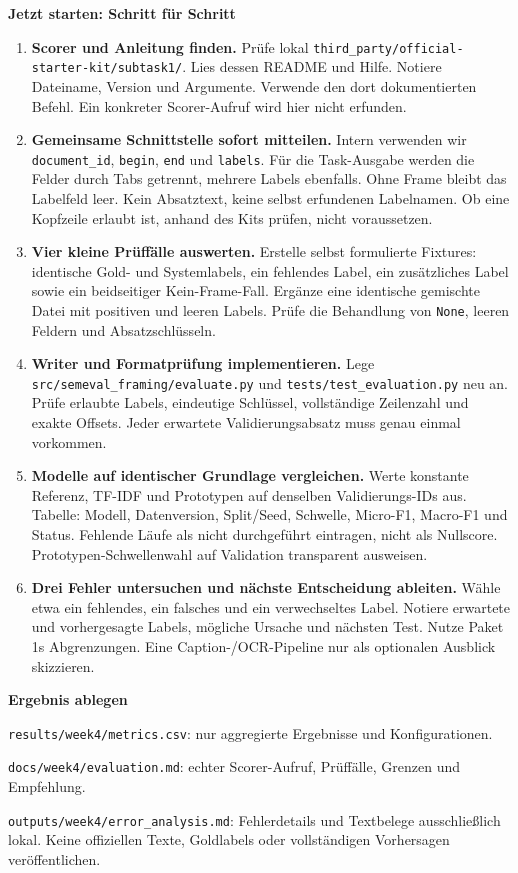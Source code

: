 \documentclass[10pt,a4paper]{article}
\newcommand{\checkbox}{\fbox{\rule{0pt}{2.4mm}\hspace{2.4mm}}}
\newcommand{\planheading}[1]{\par\vspace{9pt}\textbf{#1}\par\vspace{3pt}}
\newenvironment{startsteps}{\begin{enumerate}[leftmargin=12mm,label=\checkbox\hspace{2mm}\textbf{\arabic*.},labelsep=2mm,itemsep=7pt,parsep=2pt,topsep=4pt]}{\end{enumerate}}
\begin{document}
\planheading{Jetzt starten: Schritt für Schritt}
\begin{startsteps}
  \item \textbf{Scorer und Anleitung finden.}
    Prüfe lokal \texttt{third\_party/official-starter-kit/subtask1/}.
    Lies dessen README und Hilfe. Notiere Dateiname, Version und Argumente.
    Verwende den dort dokumentierten Befehl. Ein konkreter Scorer-Aufruf wird hier nicht erfunden.
  \item \textbf{Gemeinsame Schnittstelle sofort mitteilen.}
    Intern verwenden wir \texttt{document\_id}, \texttt{begin}, \texttt{end} und \texttt{labels}.
    Für die Task-Ausgabe werden die Felder durch Tabs getrennt, mehrere Labels ebenfalls.
    Ohne Frame bleibt das Labelfeld leer. Kein Absatztext, keine selbst erfundenen Labelnamen.
    Ob eine Kopfzeile erlaubt ist, anhand des Kits prüfen, nicht voraussetzen.
  \item \textbf{Vier kleine Prüffälle auswerten.}
    Erstelle selbst formulierte Fixtures: identische Gold- und Systemlabels,
    ein fehlendes Label, ein zusätzliches Label sowie ein beidseitiger Kein-Frame-Fall.
    Ergänze eine identische gemischte Datei mit positiven und leeren Labels.
    Prüfe die Behandlung von \texttt{None}, leeren Feldern und Absatzschlüsseln.
  \item \textbf{Writer und Formatprüfung implementieren.}
    Lege \texttt{src/semeval\_framing/evaluate.py} und
    \texttt{tests/test\_evaluation.py} neu an.
    Prüfe erlaubte Labels, eindeutige Schlüssel, vollständige Zeilenzahl und exakte Offsets.
    Jeder erwartete Validierungsabsatz muss genau einmal vorkommen.
  \item \textbf{Modelle auf identischer Grundlage vergleichen.}
    Werte konstante Referenz, TF-IDF und Prototypen auf denselben Validierungs-IDs aus.
    Tabelle: Modell, Datenversion, Split/Seed, Schwelle, Micro-F1, Macro-F1 und Status.
    Fehlende Läufe als \glqq nicht durchgeführt\grqq{} eintragen, nicht als Nullscore.
    Prototypen-Schwellenwahl auf Validation transparent ausweisen.
  \item \textbf{Drei Fehler untersuchen und nächste Entscheidung ableiten.}
    Wähle etwa ein fehlendes, ein falsches und ein verwechseltes Label.
    Notiere erwartete und vorhergesagte Labels, mögliche Ursache und nächsten Test.
    Nutze Paket 1s Abgrenzungen. Eine Caption-/OCR-Pipeline nur als optionalen Ausblick skizzieren.
\end{startsteps}

\planheading{Ergebnis ablegen}
\texttt{results/week4/metrics.csv}: nur aggregierte Ergebnisse und Konfigurationen.\par
\texttt{docs/week4/evaluation.md}: echter Scorer-Aufruf, Prüffälle, Grenzen und Empfehlung.\par
\texttt{outputs/week4/error\_analysis.md}: Fehlerdetails und Textbelege ausschließlich lokal.
Keine offiziellen Texte, Goldlabels oder vollständigen Vorhersagen veröffentlichen.
\end{document}
